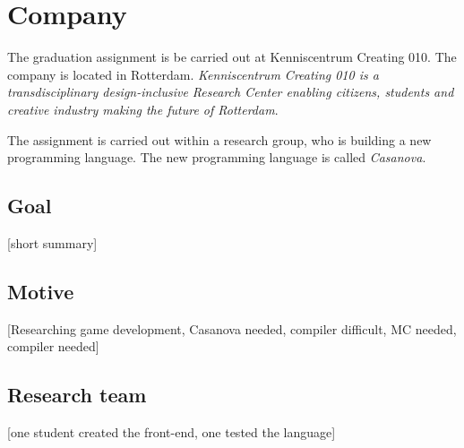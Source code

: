 \section{Company}
The graduation assignment is be carried out at Kenniscentrum Creating 010.
The company is located in Rotterdam.
\textit{Kenniscentrum Creating 010 is a transdisciplinary design-inclusive Research Center enabling citizens, students and creative industry making the future of Rotterdam}\cite{creating2016home}.

The assignment is carried out within a research group, who is building a new programming language.
The new programming language is called \emph{Casanova}.

\subsection{Goal}
[short summary]

\subsection{Motive}\label{motive}
[Researching game development, Casanova needed, compiler difficult, MC needed, compiler needed]


\subsection{Research team}
[one student created the front-end, one tested the language]

